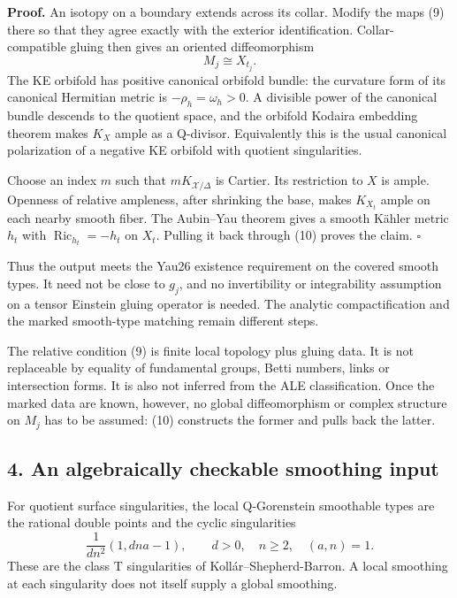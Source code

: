 \documentclass[
  11pt,
]{article}
\begin{document}
\textbf{Proof.} An isotopy on a boundary extends across its collar.
Modify the maps (9) there so that they agree exactly with the exterior
identification. Collar-compatible gluing then gives an oriented
diffeomorphism \[
                           M_j\cong X_{t_j}.           \tag{10}
\] The KE orbifold has positive canonical orbifold bundle: the curvature
form of its canonical Hermitian metric is \(-\rho_h=\omega_h>0\). A
divisible power of the canonical bundle descends to the quotient space,
and the orbifold Kodaira embedding theorem makes \(K_X\) ample as a
Q-divisor. Equivalently this is the usual canonical polarization of a
negative KE orbifold with quotient singularities.

Choose an index \(m\) such that \(mK_{\mathcal X/\Delta}\) is Cartier.
Its restriction to \(X\) is ample. Openness of relative ampleness, after
shrinking the base, makes \(K_{X_t}\) ample on each nearby smooth fiber.
The Aubin--Yau theorem gives a smooth Kähler metric \(h_t\) with
\(\operatorname{Ric}_{h_t}=-h_t\) on \(X_t\). Pulling it back through
(10) proves the claim. \(\square\)

Thus the output meets the Yau26 existence requirement on the covered
smooth types. It need not be close to \(g_j\), and no invertibility or
integrability assumption on a tensor Einstein gluing operator is needed.
The analytic compactification and the marked smooth-type matching remain
different steps.

The relative condition (9) is finite local topology plus gluing data. It
is not replaceable by equality of fundamental groups, Betti numbers,
links or intersection forms. It is also not inferred from the ALE
classification. Once the marked data are known, however, no global
diffeomorphism or complex structure on \(M_j\) has to be assumed: (10)
constructs the former and pulls back the latter.

\hypertarget{an-algebraically-checkable-smoothing-input}{%
\subsection{4. An algebraically checkable smoothing
input}\label{an-algebraically-checkable-smoothing-input}}

For quotient surface singularities, the local Q-Gorenstein smoothable
types are the rational double points and the cyclic singularities \[
                  \frac1{dn^2}(1,dna-1),\qquad
                 d>0,\quad n\ge2,\quad (a,n)=1.       \tag{11}
\] These are the class T singularities of Kollár--Shepherd-Barron. A
local smoothing at each singularity does not itself supply a global
smoothing.
\end{document}

